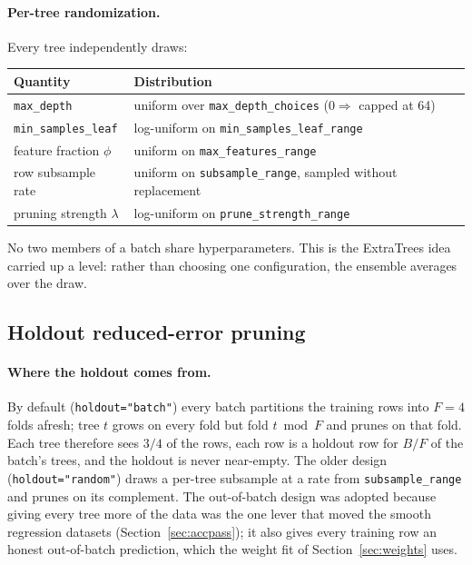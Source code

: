 \documentclass[11pt,a4paper]{article}
\newcommand{\code}[1]{\texttt{\small #1}}
\theoremstyle{definition}
\begin{document}
\paragraph{Per-tree randomization.} Every tree independently draws:
\begin{center}
\begin{tabular}{ll}
\toprule
Quantity & Distribution \\
\midrule
\code{max\_depth} & uniform over \code{max\_depth\_choices} ($0 \Rightarrow$ capped at 64) \\
\code{min\_samples\_leaf} & log-uniform on \code{min\_samples\_leaf\_range} \\
feature fraction $\phi$ & uniform on \code{max\_features\_range} \\
row subsample rate & uniform on \code{subsample\_range}, sampled without replacement \\
pruning strength $\lambda$ & log-uniform on \code{prune\_strength\_range} \\
\bottomrule
\end{tabular}
\end{center}
No two members of a batch share hyperparameters. This is the ExtraTrees idea
carried up a level: rather than choosing one configuration, the ensemble
averages over the draw.

\subsection{Holdout reduced-error pruning}\label{sec:pruning}

\paragraph{Where the holdout comes from.} By default (\code{holdout="batch"})
every batch partitions the training rows into $F = 4$ folds afresh; tree $t$
grows on every fold but fold $t \bmod F$ and prunes on that fold. Each tree
therefore sees $3/4$ of the rows, each row is a holdout row for $B/F$ of the
batch's trees, and the holdout is never near-empty. The older design
(\code{holdout="random"}) draws a per-tree subsample at a rate from
\code{subsample\_range} and prunes on its complement. The out-of-batch design
was adopted because giving every tree more of the data was the one lever that
moved the smooth regression datasets (Section~\ref{sec:accpass}); it also gives
every training row an honest out-of-batch prediction, which the weight fit of
Section~\ref{sec:weights} uses.
\end{document}

